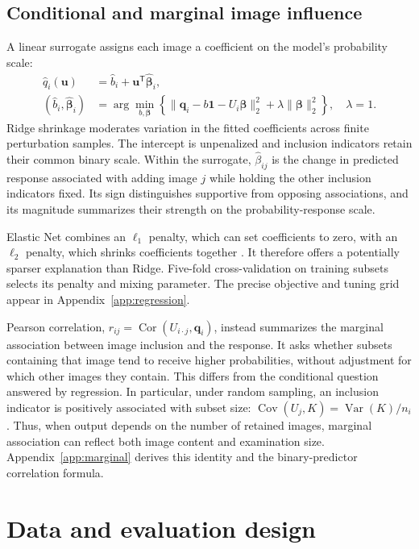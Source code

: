 \subsection{Conditional and marginal image influence}
A linear surrogate assigns each image a coefficient on the model's probability scale:
\begin{align}
\widehat q_i(\boldsymbol u)&=\widehat b_i+\boldsymbol u^{\mathsf T}\widehat{\boldsymbol\beta}_i,\\
(\widehat b_i,\widehat{\boldsymbol\beta}_i)&=
\arg\min_{b,\boldsymbol\beta}
\left\{\|\boldsymbol q_i-b\boldsymbol 1-U_i\boldsymbol\beta\|_2^2
+\lambda\|\boldsymbol\beta\|_2^2\right\},\quad\lambda=1.
\label{eq:ridge}
\end{align}
Ridge shrinkage \citep{hoerl1970ridge} moderates variation in the fitted coefficients across finite perturbation samples. The intercept is unpenalized and inclusion indicators retain their common binary scale. Within the surrogate, $\widehat\beta_{ij}$ is the change in predicted response associated with adding image $j$ while holding the other inclusion indicators fixed. Its sign distinguishes supportive from opposing associations, and its magnitude summarizes their strength on the probability-response scale.

Elastic Net combines an $\ell_1$ penalty, which can set coefficients to zero, with an $\ell_2$ penalty, which shrinks coefficients together \citep{tibshirani1996lasso,zou2005elasticnet}. It therefore offers a potentially sparser explanation than Ridge. Five-fold cross-validation on training subsets selects its penalty and mixing parameter. The precise objective and tuning grid appear in Appendix~\ref{app:regression}.

Pearson correlation, $r_{ij}=\operatorname{Cor}(U_{i\cdot j},\boldsymbol q_i)$, instead summarizes the marginal association between image inclusion and the response. It asks whether subsets containing that image tend to receive higher probabilities, without adjustment for which other images they contain. This differs from the conditional question answered by regression. In particular, under random sampling, an inclusion indicator is positively associated with subset size: $\operatorname{Cov}(U_j,K)=\operatorname{Var}(K)/n_i$. Thus, when output depends on the number of retained images, marginal association can reflect both image content and examination size. Appendix~\ref{app:marginal} derives this identity and the binary-predictor correlation formula.

\section{Data and evaluation design}
